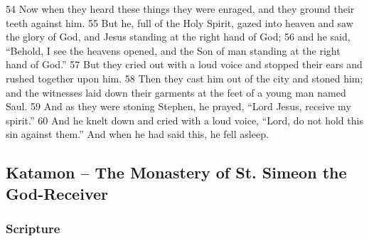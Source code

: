 \documentclass[letterpaper]{report}
\begin{document}
\begin{multicols}{2}
54 Now when they heard these things they were enraged, and they ground their teeth against him. 55 But he, full of the Holy Spirit, gazed into heaven and saw the glory of God, and Jesus standing at the right hand of God; 56 and he said, “Behold, I see the heavens opened, and the Son of man standing at the right hand of God.” 57 But they cried out with a loud voice and stopped their ears and rushed together upon him. 58 Then they cast him out of the city and stoned him; and the witnesses laid down their garments at the feet of a young man named Saul. 59 And as they were stoning Stephen, he prayed, “Lord Jesus, receive my spirit.” 60 And he knelt down and cried with a loud voice, “Lord, do not hold this sin against them.” And when he had said this, he fell asleep.
\end{multicols}

\clearpage
\subsection{Katamon -- The Monastery of St. Simeon the God-Receiver}
\begin{multicols}{2}
	\mbox{}
\end{multicols}
\subsubsection{Scripture}
\end{document}

